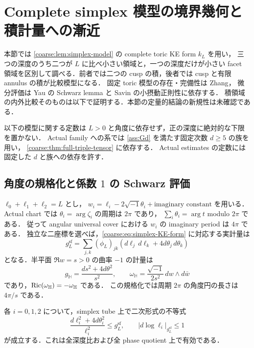 \section{Complete simplex 模型の境界幾何と積計量への漸近}
\label{simplex:sec:boundary-geometry}

本節では \cref{coarse:lem:simplex-model} の complete toric KE form $k_L$ を用い，
三つの深度のうち二つが $L$ に比べ小さい領域と，一つの深度だけが小さい
facet 領域を区別して調べる．前者では二つの cusp の積，後者では
cusp と有限 annulus の積が比較模型になる．
固定 toric 模型の存在・完備性は
Zhang\cite[Theorem~2.1, Proposition~2.2]{ZhangNegativeKE}，
微分評価は Yau の Schwarz lemma と
Savin\cite[Theorem~1.3]{SavinSmall} の小摂動正則性に依存する．
積領域の内外比較そのものは以下で証明する．本節の定量的結論の新規性は未確認である．

以下の模型に関する定数は $L>0$ と角度に依存せず，正の深度に絶対的な下限を置かない．
Actual family への系では \cref{ass:Gd} を満たす固定次数 $d\ge5$ の族を用い，
\cref{coarse:thm:full-triple-tensor} に依存する．
Actual estimates の定数には固定した $d$ と族への依存を許す．

\subsection{角度の規格化と係数 $1$ の Schwarz 評価}

$\ell_0+\ell_1+\ell_2=L$ とし，
$w_i=\ell_i-2\sqrt{-1}\theta_i+\text{imaginary constant}$ を用いる．
Actual chart では $\theta_i=\arg\zeta_i$ の周期は $2\pi$ であり，
$\sum_i\theta_i=\arg t$ modulo $2\pi$ である．
従って angular universal cover における $w_i$ の imaginary period は $4\pi$ である．
独立な二座標を選べば，\eqref{coarse:eq:simplex-KE-form} に対応する実計量は
\begin{equation}\label{simplex:eq:real-model-normalization}
 g_L^{\mathrm{sf}}
 =\sum_{j,k}(\phi_L)_{jk}
       (d\ell_j\,d\ell_k+4d\theta_j\,d\theta_k)
\end{equation}
となる．半平面 $\Re w=s>0$ の曲率 $-1$ の計量は
\[
 g_{\mathbb H}=\frac{ds^2+4d\theta^2}{s^2},
 \qquad
 \omega_{\mathbb H}
   =\frac{\sqrt{-1}}{2s^2}\,dw\wedge d\bar w
\]
であり，$\operatorname{Ric}(\omega_{\mathbb H})=-\omega_{\mathbb H}$ である．
この規格化では周期 $2\pi$ の角度円の長さは $4\pi/s$ である．

\begin{lemma}
\label{simplex:lem:rank-one-schwarz}
各 $i=0,1,2$ について，simplex tube 上で二次形式の不等式
\begin{equation}\label{simplex:eq:rank-one-schwarz}
 \frac{d\ell_i^2+4d\theta_i^2}{\ell_i^2}
       \le g_L^{\mathrm{sf}},
 \qquad
 |d\log\ell_i|_{g_L^{\mathrm{sf}}}\le1
\end{equation}
が成立する．これは全深度比および全 phase quotient 上で有効である．
\end{lemma}

